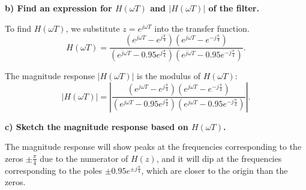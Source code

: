 \documentclass{article}
\begin{document}
\textbf{b) Find an expression for \( H(\omega T) \) and \( | H(\omega T) | \) of the filter.}

To find \( H(\omega T) \), we substitute \( z = e^{j\omega T} \) into the transfer function.
\[
    H(\omega T) = \frac{(e^{j\omega T} - e^{j \frac{\pi}{4}})(e^{j\omega T} - e^{-j \frac{\pi}{4}})}{(e^{j\omega T} - 0.95e^{j \frac{\pi}{4}})(e^{j\omega T} - 0.95e^{-j \frac{\pi}{4}})}.
\]

The magnitude response \( | H(\omega T) | \) is the modulus of \( H(\omega T) \):
\[
    | H(\omega T) | = \left| \frac{(e^{j\omega T} - e^{j \frac{\pi}{4}})(e^{j\omega T} - e^{-j \frac{\pi}{4}})}{(e^{j\omega T} - 0.95e^{j \frac{\pi}{4}})(e^{j\omega T} - 0.95e^{-j \frac{\pi}{4}})} \right|.
\]

\textbf{c) Sketch the magnitude response based on \( H(\omega T) \).}

The magnitude response will show peaks at the frequencies corresponding to the zeros \( \pm \frac{\pi}{4} \) due to the numerator of \( H(z) \), and it will dip at the frequencies corresponding to the poles \( \pm 0.95e^{\pm j\frac{\pi}{4}} \), which are closer to the origin than the zeros.


\begin{center}
\end{center}
\end{document}
